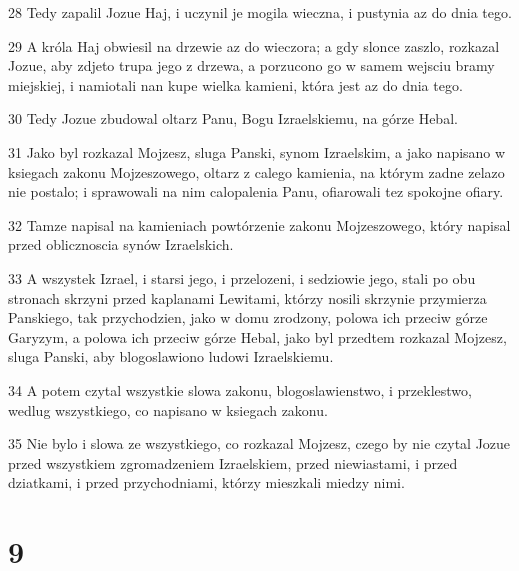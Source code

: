 \par 28 Tedy zapalil Jozue Haj, i uczynil je mogila wieczna, i pustynia az do dnia tego.
\par 29 A króla Haj obwiesil na drzewie az do wieczora; a gdy slonce zaszlo, rozkazal Jozue, aby zdjeto trupa jego z drzewa, a porzucono go w samem wejsciu bramy miejskiej, i namiotali nan kupe wielka kamieni, która jest az do dnia tego.
\par 30 Tedy Jozue zbudowal oltarz Panu, Bogu Izraelskiemu, na górze Hebal.
\par 31 Jako byl rozkazal Mojzesz, sluga Panski, synom Izraelskim, a jako napisano w ksiegach zakonu Mojzeszowego, oltarz z calego kamienia, na którym zadne zelazo nie postalo; i sprawowali na nim calopalenia Panu, ofiarowali tez spokojne ofiary.
\par 32 Tamze napisal na kamieniach powtórzenie zakonu Mojzeszowego, który napisal przed oblicznoscia synów Izraelskich.
\par 33 A wszystek Izrael, i starsi jego, i przelozeni, i sedziowie jego, stali po obu stronach skrzyni przed kaplanami Lewitami, którzy nosili skrzynie przymierza Panskiego, tak przychodzien, jako w domu zrodzony, polowa ich przeciw górze Garyzym, a polowa ich przeciw górze Hebal, jako byl przedtem rozkazal Mojzesz, sluga Panski, aby blogoslawiono ludowi Izraelskiemu.
\par 34 A potem czytal wszystkie slowa zakonu, blogoslawienstwo, i przeklestwo, wedlug wszystkiego, co napisano w ksiegach zakonu.
\par 35 Nie bylo i slowa ze wszystkiego, co rozkazal Mojzesz, czego by nie czytal Jozue przed wszystkiem zgromadzeniem Izraelskiem, przed niewiastami, i przed dziatkami, i przed przychodniami, którzy mieszkali miedzy nimi.

\chapter{9}

